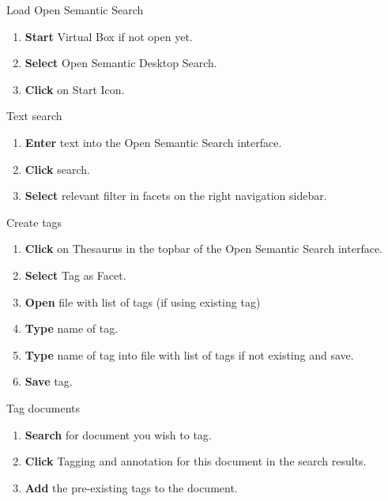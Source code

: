 \documentclass[10pt,a4paper]{article}
\begin{document}
\begin{textbox}{Load Open Semantic Search}
 

  

\begin{enumerate}
\item \textbf{Start} Virtual Box if not open yet.
\item \textbf{Select} Open Semantic Desktop Search.
\item \textbf{Click} on Start Icon. 
\end{enumerate}

\end{textbox}


\begin{textbox}{Text search}
 
  

\begin{enumerate}
\item \textbf{Enter} text into the Open Semantic Search interface. 
\item \textbf{Click} search.
\item \textbf{Select} relevant filter in facets on the right navigation sidebar. 
\end{enumerate}

\end{textbox}


\begin{textbox}{Create tags}
 

  

\begin{enumerate}
\item \textbf{Click} on Thesaurus in the topbar of the Open Semantic Search interface.
\item \textbf{Select} Tag as Facet. 
\item \textbf{Open} file with list of tags (if using existing tag)
\item \textbf{Type} name of tag.
\item \textbf{Type} name of tag into file with list of tags if not existing and save.
\item \textbf{Save} tag. 
 
\end{enumerate}

\end{textbox}

\begin{textbox}{Tag documents}

  

\begin{enumerate}
\item \textbf{Search} for document you wish to tag.
\item \textbf{Click} Tagging and annotation for this document in the search results.
\item \textbf{Add} the pre-existing tags to the document. 
\end{enumerate}

\end{textbox}
\end{document}
